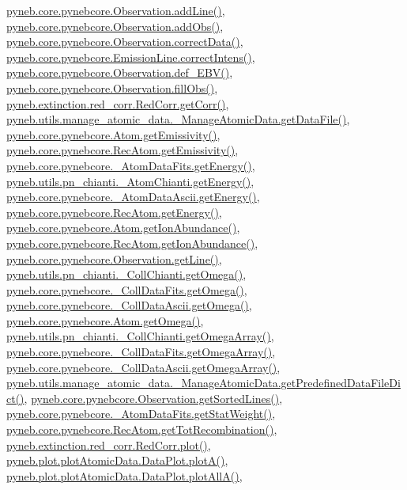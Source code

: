\hyperlink{pynebcore_8py_source_l03558}{pyneb.\-core.\-pynebcore.\-Observation.\-add\-Line()}, \hyperlink{pynebcore_8py_source_l03589}{pyneb.\-core.\-pynebcore.\-Observation.\-add\-Obs()}, \hyperlink{pynebcore_8py_source_l04028}{pyneb.\-core.\-pynebcore.\-Observation.\-correct\-Data()}, \hyperlink{pynebcore_8py_source_l03447}{pyneb.\-core.\-pynebcore.\-Emission\-Line.\-correct\-Intens()}, \hyperlink{pynebcore_8py_source_l03983}{pyneb.\-core.\-pynebcore.\-Observation.\-def\-\_\-\-E\-B\-V()}, \hyperlink{pynebcore_8py_source_l03574}{pyneb.\-core.\-pynebcore.\-Observation.\-fill\-Obs()}, \hyperlink{red__corr_8py_source_l00211}{pyneb.\-extinction.\-red\-\_\-corr.\-Red\-Corr.\-get\-Corr()}, \hyperlink{manage__atomic__data_8py_source_l00297}{pyneb.\-utils.\-manage\-\_\-atomic\-\_\-data.\-\_\-\-Manage\-Atomic\-Data.\-get\-Data\-File()}, \hyperlink{pynebcore_8py_source_l01782}{pyneb.\-core.\-pynebcore.\-Atom.\-get\-Emissivity()}, \hyperlink{pynebcore_8py_source_l02990}{pyneb.\-core.\-pynebcore.\-Rec\-Atom.\-get\-Emissivity()}, \hyperlink{pynebcore_8py_source_l00275}{pyneb.\-core.\-pynebcore.\-\_\-\-Atom\-Data\-Fits.\-get\-Energy()}, \hyperlink{pn__chianti_8py_source_l00366}{pyneb.\-utils.\-pn\-\_\-chianti.\-\_\-\-Atom\-Chianti.\-get\-Energy()}, \hyperlink{pynebcore_8py_source_l00537}{pyneb.\-core.\-pynebcore.\-\_\-\-Atom\-Data\-Ascii.\-get\-Energy()}, \hyperlink{pynebcore_8py_source_l02927}{pyneb.\-core.\-pynebcore.\-Rec\-Atom.\-get\-Energy()}, \hyperlink{pynebcore_8py_source_l02176}{pyneb.\-core.\-pynebcore.\-Atom.\-get\-Ion\-Abundance()}, \hyperlink{pynebcore_8py_source_l03083}{pyneb.\-core.\-pynebcore.\-Rec\-Atom.\-get\-Ion\-Abundance()}, \hyperlink{pynebcore_8py_source_l03665}{pyneb.\-core.\-pynebcore.\-Observation.\-get\-Line()}, \hyperlink{pn__chianti_8py_source_l00507}{pyneb.\-utils.\-pn\-\_\-chianti.\-\_\-\-Coll\-Chianti.\-get\-Omega()}, \hyperlink{pynebcore_8py_source_l00828}{pyneb.\-core.\-pynebcore.\-\_\-\-Coll\-Data\-Fits.\-get\-Omega()}, \hyperlink{pynebcore_8py_source_l01082}{pyneb.\-core.\-pynebcore.\-\_\-\-Coll\-Data\-Ascii.\-get\-Omega()}, \hyperlink{pynebcore_8py_source_l01324}{pyneb.\-core.\-pynebcore.\-Atom.\-get\-Omega()}, \hyperlink{pn__chianti_8py_source_l00484}{pyneb.\-utils.\-pn\-\_\-chianti.\-\_\-\-Coll\-Chianti.\-get\-Omega\-Array()}, \hyperlink{pynebcore_8py_source_l00800}{pyneb.\-core.\-pynebcore.\-\_\-\-Coll\-Data\-Fits.\-get\-Omega\-Array()}, \hyperlink{pynebcore_8py_source_l01058}{pyneb.\-core.\-pynebcore.\-\_\-\-Coll\-Data\-Ascii.\-get\-Omega\-Array()}, \hyperlink{manage__atomic__data_8py_source_l00034}{pyneb.\-utils.\-manage\-\_\-atomic\-\_\-data.\-\_\-\-Manage\-Atomic\-Data.\-get\-Predefined\-Data\-File\-Dict()}, \hyperlink{pynebcore_8py_source_l03684}{pyneb.\-core.\-pynebcore.\-Observation.\-get\-Sorted\-Lines()}, \hyperlink{pynebcore_8py_source_l00249}{pyneb.\-core.\-pynebcore.\-\_\-\-Atom\-Data\-Fits.\-get\-Stat\-Weight()}, \hyperlink{pynebcore_8py_source_l02851}{pyneb.\-core.\-pynebcore.\-Rec\-Atom.\-get\-Tot\-Recombination()}, \hyperlink{red__corr_8py_source_l00303}{pyneb.\-extinction.\-red\-\_\-corr.\-Red\-Corr.\-plot()}, \hyperlink{plot_atomic_data_8py_source_l00117}{pyneb.\-plot.\-plot\-Atomic\-Data.\-Data\-Plot.\-plot\-A()}, \hyperlink{plot_atomic_data_8py_source_l00189}{pyneb.\-plot.\-plot\-Atomic\-Data.\-Data\-Plot.\-plot\-All\-A()}, 